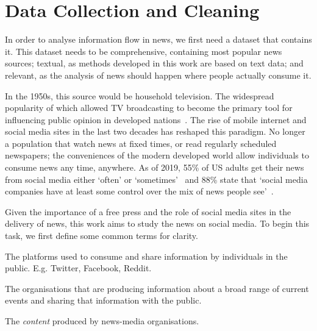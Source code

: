 \chapter{Data Collection and Cleaning}


In order to analyse information flow in news, we first need a dataset that contains it. This dataset needs to be comprehensive, containing most popular news sources; textual, as methods developed in this work are based on text data; and relevant, as the analysis of news should happen where people actually consume it.

In the 1950s, this source would be household television. The widespread popularity of which allowed TV broadcasting to become the primary tool for influencing public opinion in developed nations~\cite{diggs-brown_strategic_2011}. 
The rise of mobile internet and social media sites in the last two decades has reshaped this paradigm. No longer a population that watch news at fixed times, or read regularly scheduled newspapers; the conveniences of the modern developed world allow individuals to consume news any time, anywhere. As of 2019, 55\% of US adults get their news from social media either `often' or `sometimes'~ and 88\% state that `social media companies have at least some control over the mix of news people see'~\cite{shearer_americans_2019}.

Given the importance of a free press and the role of social media sites in the delivery of news, this work aims to study the news on social media. To begin this task, we first define some common terms for clarity.

\begin{definition}
	The platforms used to consume and share information by individuals in the public. E.g. Twitter, Facebook, Reddit.
\end{definition}

\begin{definition}
	The organisations that are producing information about a broad range of current events and sharing that information with the public.
\end{definition}

\begin{definition}[News]
	The \emph{content} produced by news-media organisations. 
\end{definition}


